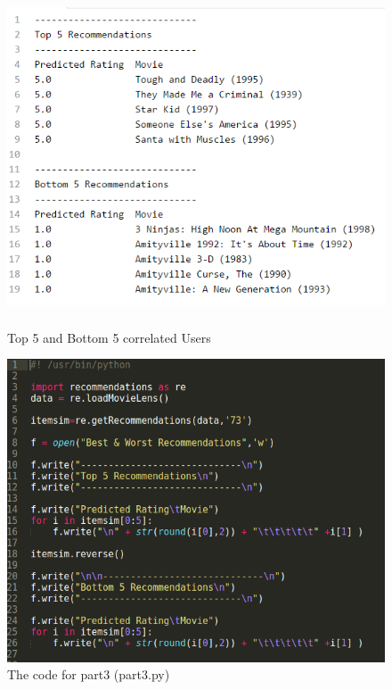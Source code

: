 \documentclass{article}
\begin{document}
\begin{figure}[H]
 \centering
 	\includegraphics[height=10cm]{rec.png}
  \caption{Top 5 and Bottom 5 correlated Users}
\end{figure}

\begin{figure}[H]
 \centering
 	\includegraphics[height=10 cm]{p3.png}
  \caption{The code for part3 (part3.py)}
\end{figure}

\newpage



\end{document}
